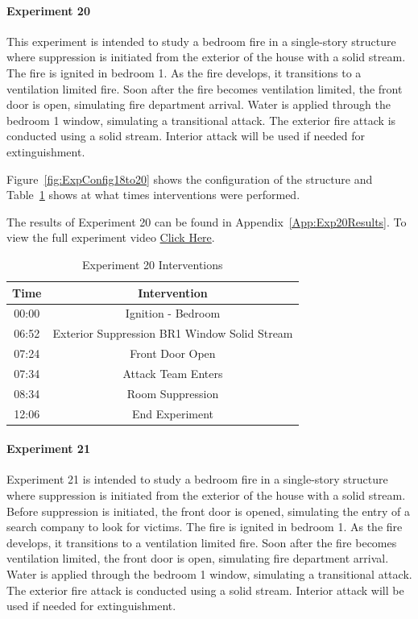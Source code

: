 \documentclass[12pt,oneside]{book}
\begin{document}
\clearpage

\paragraph{Experiment 20} \mbox{}

This experiment is intended to study a bedroom fire in a single-story structure where suppression is initiated from the exterior of the house with a solid stream. The fire is ignited in bedroom 1. As the fire develops, it transitions to a ventilation limited fire. Soon after the fire becomes ventilation limited, the front door is open, simulating fire department arrival. Water is applied through the bedroom 1 window, simulating a transitional attack. The exterior fire attack is conducted using a solid stream. Interior attack will be used if needed for extinguishment.  

Figure~\ref{fig:ExpConfig18to20} shows the configuration of the structure and Table~\ref{Table:Exp20Interventions} shows at what times interventions were performed. 

The results of Experiment 20 can be found in Appendix~\ref{App:Exp20Results}. To view the full experiment video \href{https://youtu.be/gl8rc1Nsl1k}{Click Here}.

\begin{table}[H]
	\centering
	\caption{Experiment 20 Interventions}
	\begin{tabular}{|c|c|} 
		\hline
		Time & Intervention \\ \hline \hline
		00:00 & Ignition - Bedroom \\ \hline
		06:52 & Exterior Suppression BR1 Window Solid Stream \\ \hline
		07:24 & Front Door Open \\ \hline
		07:34 & Attack Team Enters\\ \hline
		08:34 & Room Suppression \\ \hline 
		12:06 & End Experiment\\ \hline
	\end{tabular}
	\label{Table:Exp20Interventions}
\end{table}

\clearpage

\paragraph{Experiment 21} \mbox{}

Experiment 21 is intended to study a bedroom fire in a single-story structure where suppression is initiated from the exterior of the house with a solid stream. Before suppression is initiated, the front door is opened, simulating the entry of a search company to look for victims. The fire is ignited in bedroom 1. As the fire develops, it transitions to a ventilation limited fire. Soon after the fire becomes ventilation limited, the front door is open, simulating fire department arrival. Water is applied through the bedroom 1 window, simulating a transitional attack. The exterior fire attack is conducted using a solid stream. Interior attack will be used if needed for extinguishment.
\end{document}
